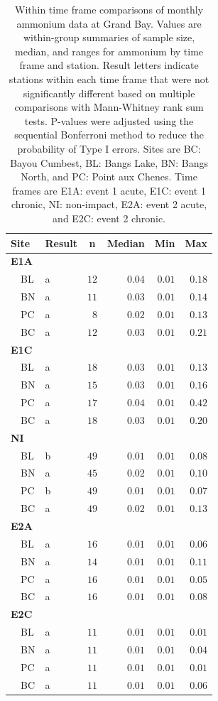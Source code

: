 \documentclass[letterpaper,12pt]{article}\usepackage[]{graphicx}\usepackage[]{color}
\begin{document}
\clearpage

\begin{table}[!tbp]
\caption{Within time frame comparisons of monthly ammonium data at Grand Bay.  Values are within-group summaries of sample size, median, and ranges for ammonium by time frame and station.  Result letters indicate stations within each time frame that were not significantly different based on multiple comparisons with Mann-Whitney rank sum tests.  P-values were adjusted using the sequential Bonferroni method to reduce the probability of Type I errors. Sites are BC: Bayou Cumbest, BL: Bangs Lake, BN: Bangs North, and PC: Point aux Chenes.  Time frames are E1A: event 1 acute, E1C: event 1 chronic, NI: non-impact, E2A: event 2 acute, and E2C: event 2 chronic.\label{tab:ammontab2}} 
\begin{center}
\begin{tabular}{llrrrr}
\hline\hline
\multicolumn{1}{l}{Site}&\multicolumn{1}{c}{Result}&\multicolumn{1}{c}{n}&\multicolumn{1}{c}{Median}&\multicolumn{1}{c}{Min}&\multicolumn{1}{c}{Max}\tabularnewline
\hline
{\bfseries E1A}&&&&&\tabularnewline
~~BL&a&$12$&$0.04$&$0.01$&$0.18$\tabularnewline
~~BN&a&$11$&$0.03$&$0.01$&$0.14$\tabularnewline
~~PC&a&$ 8$&$0.02$&$0.01$&$0.13$\tabularnewline
~~BC&a&$12$&$0.03$&$0.01$&$0.21$\tabularnewline
\hline
{\bfseries E1C}&&&&&\tabularnewline
~~BL&a&$18$&$0.03$&$0.01$&$0.13$\tabularnewline
~~BN&a&$15$&$0.03$&$0.01$&$0.16$\tabularnewline
~~PC&a&$17$&$0.04$&$0.01$&$0.42$\tabularnewline
~~BC&a&$18$&$0.03$&$0.01$&$0.20$\tabularnewline
\hline
{\bfseries NI}&&&&&\tabularnewline
~~BL&b&$49$&$0.01$&$0.01$&$0.08$\tabularnewline
~~BN&a&$45$&$0.02$&$0.01$&$0.10$\tabularnewline
~~PC&b&$49$&$0.01$&$0.01$&$0.07$\tabularnewline
~~BC&a&$49$&$0.02$&$0.01$&$0.13$\tabularnewline
\hline
{\bfseries E2A}&&&&&\tabularnewline
~~BL&a&$16$&$0.01$&$0.01$&$0.06$\tabularnewline
~~BN&a&$14$&$0.01$&$0.01$&$0.11$\tabularnewline
~~PC&a&$16$&$0.01$&$0.01$&$0.05$\tabularnewline
~~BC&a&$16$&$0.01$&$0.01$&$0.08$\tabularnewline
\hline
{\bfseries E2C}&&&&&\tabularnewline
~~BL&a&$11$&$0.01$&$0.01$&$0.01$\tabularnewline
~~BN&a&$11$&$0.01$&$0.01$&$0.04$\tabularnewline
~~PC&a&$11$&$0.01$&$0.01$&$0.01$\tabularnewline
~~BC&a&$11$&$0.01$&$0.01$&$0.06$\tabularnewline
\hline
\end{tabular}\end{center}

\end{table}
\end{document}
